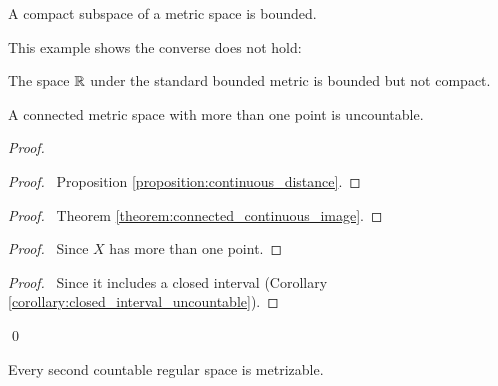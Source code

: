 \begin{proposition}
    \label{proposition:bounded_compact}
    A compact subspace of a metric space is bounded.
\end{proposition}


This example shows the converse does not hold:

\begin{example}
    The space $\mathbb{R}$ under the standard bounded metric is bounded but not compact.
\end{example}

\begin{proposition}
    A connected metric space with more than one point is uncountable.
\end{proposition}

\begin{proof}
    \pf
    \begin{proof}
        \pf\ Proposition \ref{proposition:continuous_distance}.
    \end{proof}
    \begin{proof}
        \pf\ Theorem \ref{theorem:connected_continuous_image}.
    \end{proof}
    \begin{proof}
        \pf\ Since $X$ has more than one point.
    \end{proof}
    \begin{proof}
        \pf\ Since it includes a closed interval (Corollary \ref{corollary:closed_interval_uncountable}).
    \end{proof}
    \qed
\end{proof}

\begin{theorem}
    Every second countable regular space is metrizable.
\end{theorem}

